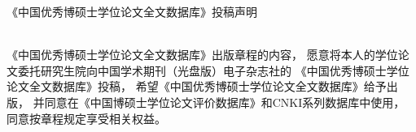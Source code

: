 \begin{mcopyright}
	\centerline{\heiti\fontsize{20}{20}《中国优秀博硕士学位论文全文数据库》投稿声明}
	\thispagestyle{empty}
	{
		\vskip 1.5cm
		\\
		《中国优秀博硕士学位论文全文数据库》出版章程的内容，
		愿意将本人的学位论文委托研究生院向中国学术期刊（光盘版）电子杂志社的
		《中国优秀博硕士学位论文全文数据库》投稿，
		希望《中国优秀博硕士学位论文全文数据库》给予出版，
		并同意在《中国博硕士学位论文评价数据库》和CNKI系列数据库中使用，
		同意按章程规定享受相关权益。\\ 
	}
\end{mcopyright}